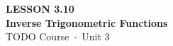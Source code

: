 \documentclass[aspectratio=169, 11pt]{beamer}
\begin{document}
{
\begin{frame}[plain]
  \vspace{2.8cm}\hspace{0.55cm}%
  \begin{minipage}{0.9\textwidth}
    {\color{goldacc}\bfseries\small LESSON 3.10}\\[0.5cm]
    {\color{white}\bfseries\LARGE Inverse Trigonometric Functions}\\[1.2cm]
    {\color{skymid}\small TODO Course~$\cdot$~Unit 3}
  \end{minipage}
\end{frame}
}

\begin{frame}[t, plain]
\end{frame}
\end{document}
